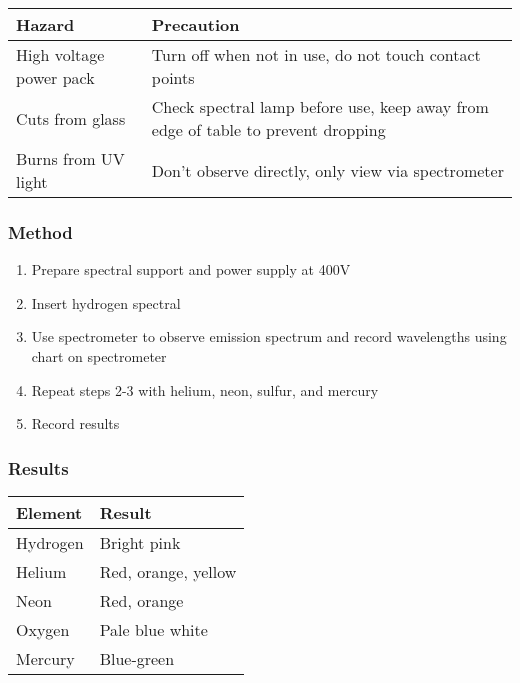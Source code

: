\documentclass{report}
\begin{document}
			\begin{table}[H]
				\centering
				\begin{tabular}{p{7cm}|p{7cm}}
					\textbf{Hazard} & \textbf{Precaution} \\ \hline
					High voltage power pack & Turn off when not in use, do not touch contact points \\
					Cuts from glass & Check spectral lamp before use, keep away from edge of table to prevent dropping \\
					Burns from UV light & Don't observe directly, only view via spectrometer
					
				\end{tabular}
			\end{table}

		\subsubsection{Method}
			\begin{enumerate}
				\item Prepare spectral support and power supply at 400V
				\item Insert hydrogen spectral
				\item Use spectrometer to observe emission spectrum and record wavelengths using chart on spectrometer
				\item Repeat steps 2-3 with helium, neon, sulfur, and mercury
				\item Record results
			\end{enumerate}

		\subsubsection{Results}
			\begin{table}[H]
				\centering
				\begin{tabular}{p{3cm}|p{10cm}}
					\textbf{Element}	& \textbf{Result}			\\ \hline
					Hydrogen		& Bright pink				\\
					Helium			& Red, orange, yellow			\\
					Neon			& Red, orange				\\
					Oxygen			& Pale blue white			\\
					Mercury			& Blue-green				\\
				\end{tabular}
			\end{table}
\end{document}
